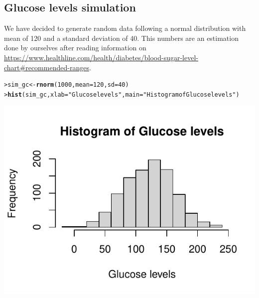 \documentclass{article}\usepackage[]{graphicx}\usepackage[]{xcolor}
\makeatletter
\def\maxwidth{ %
  \ifdim\Gin@nat@width>\linewidth
    \linewidth
  \else
    \Gin@nat@width
  \fi
}
\newcommand{\hlnum}[1]{\textcolor[rgb]{0.686,0.059,0.569}{#1}}%
\newcommand{\hlstr}[1]{\textcolor[rgb]{0.192,0.494,0.8}{#1}}%
\newcommand{\hlstd}[1]{\textcolor[rgb]{0.345,0.345,0.345}{#1}}%
\newcommand{\hlkwb}[1]{\textcolor[rgb]{0.69,0.353,0.396}{#1}}%
\newcommand{\hlkwc}[1]{\textcolor[rgb]{0.333,0.667,0.333}{#1}}%
\newcommand{\hlkwd}[1]{\textcolor[rgb]{0.737,0.353,0.396}{\textbf{#1}}}%
\newenvironment{kframe}{%
 \def\at@end@of@kframe{}%
 \ifinner\ifhmode%
  \def\at@end@of@kframe{\end{minipage}}%
  \begin{minipage}{\columnwidth}%
 \fi\fi%
 \def\FrameCommand##1{\hskip\@totalleftmargin \hskip-\fboxsep
 \colorbox{shadecolor}{##1}\hskip-\fboxsep
     \hskip-\linewidth \hskip-\@totalleftmargin \hskip\columnwidth}%
 \MakeFramed {\advance\hsize-\width
   \@totalleftmargin\z@ \linewidth\hsize
   \@setminipage}}%
 {\par\unskip\endMakeFramed%
 \at@end@of@kframe}
\newenvironment{knitrout}{}{} %
\makeatother
\begin{document}
\subsection*{Glucose levels simulation}
We have decided to generate random data following a normal distribution with mean of 120 and a standard deviation of 40. This numbers are an estimation done by ourselves after reading information on \url{https://www.healthline.com/health/diabetes/blood-sugar-level-chart#recommended-ranges}.
\begin{knitrout}\footnotesize
{}\color{fgcolor}\begin{kframe}
\begin{alltt}
\hlstd{> }\hlstd{sim_gc} \hlkwb{<-} \hlkwd{rnorm}\hlstd{(}\hlnum{1000}\hlstd{,} \hlkwc{mean} \hlstd{=} \hlnum{120}\hlstd{,} \hlkwc{sd} \hlstd{=} \hlnum{40}\hlstd{)}
\hlstd{> }\hlkwd{hist}\hlstd{(sim_gc,} \hlkwc{xlab} \hlstd{=} \hlstr{"Glucose levels"}\hlstd{,} \hlkwc{main} \hlstd{=} \hlstr{"Histogram of Glucose levels"}\hlstd{)}
\end{alltt}
\end{kframe}

{\centering \includegraphics[width=\maxwidth]{figure/sim_gc-1} 

}


\end{knitrout}
\end{document}
